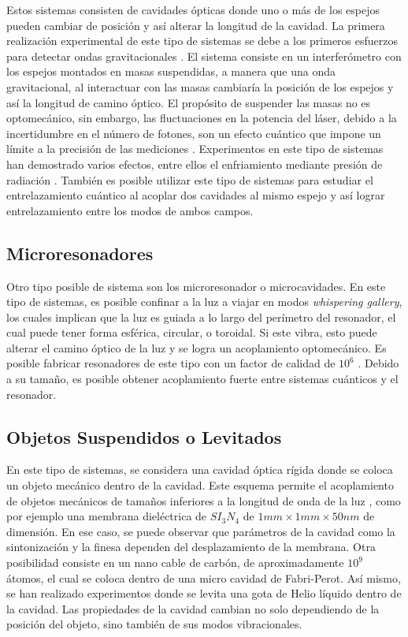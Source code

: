 \documentclass[10pt,a4paper]{report}
\begin{document}
Estos sistemas consisten de cavidades ópticas donde uno o más de los espejos pueden cambiar de posición y así alterar la longitud de la cavidad. La primera realización experimental de este tipo de sistemas se debe a los primeros esfuerzos para detectar ondas gravitacionales \cite{AbramoviciLIGO}. El sistema consiste en un interferómetro con los espejos montados en masas suspendidas, a manera que una onda gravitacional, al interactuar con las masas cambiaría la posición de los espejos y así la longitud de camino óptico. El propósito de suspender las masas no es optomecánico, sin embargo, las fluctuaciones en la potencia del láser, debido a la incertidumbre en el número de fotones, son un efecto cuántico que impone un límite a la precisión de las mediciones \cite{CavesIF}. Experimentos en este tipo de sistemas han demostrado varios efectos, entre ellos el enfriamiento mediante presión de radiación \cite{CorbittOC}. También es posible utilizar este tipo de sistemas para estudiar el entrelazamiento cuántico\cite{ChenED} al acoplar dos cavidades al mismo espejo y así lograr entrelazamiento entre los modos de ambos campos.

\subsection{Microresonadores}

Otro tipo posible de sistema son los microresonador o microcavidades. En este tipo de sistemas, es posible confinar a la luz a viajar en modos \textit{whispering gallery}, los cuales implican que la luz es guiada a lo largo del perímetro del resonador, el cual puede tener forma esférica, circular, o toroidal\cite{VahalaOM}. Si este vibra, esto puede alterar el camino óptico de la luz y se logra un acoplamiento optomecánico. Es posible fabricar resonadores de este tipo con un factor de calidad de $10^6$ \cite{EuroSensors2017}. Debido a su tamaño, es posible obtener acoplamiento fuerte entre sistemas cuánticos y el resonador\cite{VerhagenMOC}.

\subsection{Objetos Suspendidos o Levitados}

En este tipo de sistemas, se considera una cavidad óptica rígida donde se coloca un objeto mecánico dentro de la cavidad. Este esquema permite el acoplamiento de objetos mecánicos de tamaños inferiores a la longitud de onda de la luz \cite{KippenberCO}, como por ejemplo una membrana dieléctrica de $SI_3N_4$ de  $1mm \times 1mm \times 50nm$
de dimensión\cite{SankeyMC}. En ese caso, se puede observar que parámetros de la cavidad como la sintonización y la finesa dependen del desplazamiento de la membrana. Otra posibilidad consiste en un nano cable de carbón, de aproximadamente $10^9$ átomos, el cual se coloca dentro de una micro cavidad de Fabri-Perot. Así mismo, se han realizado experimentos donde se levita una gota de Helio líquido dentro de la cavidad\cite{ChildressLD}. Las propiedades de la cavidad cambian no solo dependiendo de la posición del objeto, sino también de sus modos vibracionales\cite{FaveroCR}.  
\end{document}
